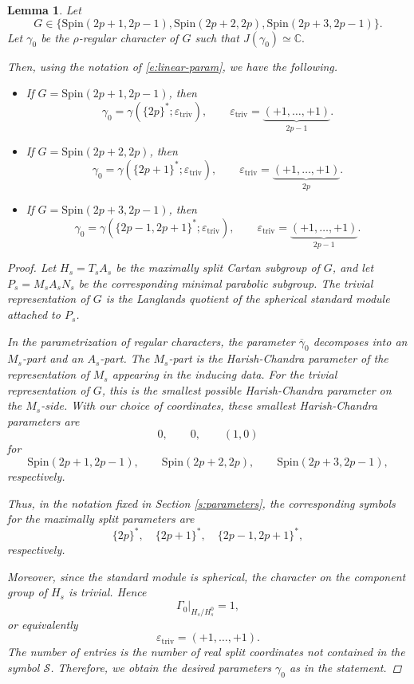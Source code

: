 \documentclass{amsart}
\newcommand{\bbC}{{\mathbb{C}}}
\newcommand{\Spin}{{\mathrm{Spin}}}
\newtheorem{lemma}[thm]{Lemma}
\theoremstyle{definition}
\begin{document}
\begin{lemma}\label{l:triv-param}
Let
\[
G\in
\{\Spin(2p+1,2p-1),\Spin(2p+2,2p),\Spin(2p+3,2p-1)\}.
\]
Let $\gamma_0$ be the $\rho$-regular character of $G$ such that
$J(\gamma_0)\simeq \bbC.$

Then, using the notation of \eqref{e:linear-param}, we have the following.

\begin{itemize}
    \item[(a)] If $G=\Spin(2p+1,2p-1)$, then
    \[
    \gamma_0=\gamma(\{2p\}^*;\varepsilon_{\mathrm{triv}}),
    \qquad
    \varepsilon_{\mathrm{triv}}
    =
    \underbrace{(+1,\ldots,+1)}_{2p-1}.
    \]

    \item[(b)] If $G=\Spin(2p+2,2p)$, then
    \[
    \gamma_0=\gamma(\{2p+1\}^*;\varepsilon_{\mathrm{triv}}),
    \qquad
    \varepsilon_{\mathrm{triv}}
    =
    \underbrace{(+1,\ldots,+1)}_{2p}.
    \]

    \item[(c)] If $G=\Spin(2p+3,2p-1)$, then
    \[
    \gamma_0=\gamma(\{2p-1,2p+1\}^*;\varepsilon_{\mathrm{triv}}),
    \qquad
    \varepsilon_{\mathrm{triv}}
    =
    \underbrace{(+1,\ldots,+1)}_{2p-1}.
    \]
\end{itemize}

\begin{proof}
Let $H_s=T_sA_s$ be the maximally split Cartan subgroup of $G$, and let
$P_s=M_sA_sN_s$ be the corresponding minimal parabolic subgroup. The trivial
representation of $G$ is the Langlands quotient of the spherical standard
module attached to $P_s$.

In the parametrization of regular characters, the parameter
$\overline\gamma_0$ decomposes into an $M_s$-part and an $A_s$-part. The
$M_s$-part is the Harish-Chandra parameter of the representation of $M_s$
appearing in the inducing data. For the trivial representation of $G$, this is
the smallest possible Harish-Chandra parameter on the $M_s$-side. With our
choice of coordinates, these smallest Harish-Chandra parameters are
\[
0,\qquad 0,\qquad (1,0)
\]
for
\[
\Spin(2p+1,2p-1),\qquad
\Spin(2p+2,2p),\qquad
\Spin(2p+3,2p-1),
\]
respectively.

Thus, in the notation fixed in Section \ref{s:parameters}, the corresponding
symbols for the maximally split parameters are
\[
\{2p\}^*,\quad
\{2p+1\}^*,\quad
\{2p-1,2p+1\}^*,
\]
respectively.

Moreover, since the standard module is spherical, the character on the
component group of $H_s$ is trivial. Hence
\[
\Gamma_0|_{H_s/H_s^0}=1,
\]
or equivalently
\[
\varepsilon_{\mathrm{triv}}=(+1,\ldots,+1).
\]
The number of entries is the number of real split coordinates not contained in
the symbol $\mathcal S$.  Therefore, we obtain the desired parameters $\gamma_0$ as in the statement. 

\end{proof}


\end{lemma}
\end{document}
